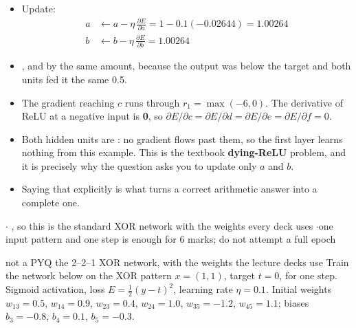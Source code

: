 {\begin{itemize}
        \[ \frac{\partial E}{\partial a} = \delta\,s_1 = -0.05288 \times 0.5
           = -0.02644 \]
        and $\partial E / \partial b$ is the same, because $s_1 = s_2$.
  \item Update:
        \begin{align*}
        a &\leftarrow a - \eta\,\frac{\partial E}{\partial a}
           = 1 - 0.1(-0.02644) = \mathbf{1.00264} \\
        b &\leftarrow b - \eta\,\frac{\partial E}{\partial b} = \mathbf{1.00264}
        \end{align*}
  \item {}, and by the same amount, because the
        output was below the target and both units fed it the same 0.5.
\end{itemize}
\begin{itemize}
  \item The gradient reaching $c$ runs through $r_1 = \max(-6, 0)$. The derivative of
        ReLU at a negative input is \textbf{0}, so
        $\partial E/\partial c = \partial E/\partial d = \partial E/\partial e =
         \partial E/\partial f = 0$.
  \item Both hidden units are : no gradient
        flows past them, so the first layer learns nothing from this example. This is the
        textbook \textbf{dying-ReLU} problem, and it is precisely why the question asks
        you to update only $a$ and $b$.
  \item Saying that explicitly is what turns a correct arithmetic answer into a complete
        one.
\end{itemize}}


{\color{sub}\footnotesize {}  \gap$\cdot$\gap
{}, so this is the standard XOR network
with the weights every deck uses \gap$\cdot$\gap one input pattern and one step is
enough for 6 marks; do not attempt a full epoch}

\begin{asked}[PROBLEM]{not a PYQ \textperiodcentered{} the 2--2--1 XOR network, with the weights the lecture decks use}
Train the network below on the XOR pattern $x = (1, 1)$, target $t = 0$, for one step.
Sigmoid activation, loss $E = \tfrac12 (y-t)^2$, learning rate $\eta = 0.1$.
Initial weights $w_{13}=0.5$, $w_{14}=0.9$, $w_{23}=0.4$, $w_{24}=1.0$,
$w_{35}=-1.2$, $w_{45}=1.1$; biases $b_3=-0.8$, $b_4=0.1$, $b_5=-0.3$.
\end{asked}

